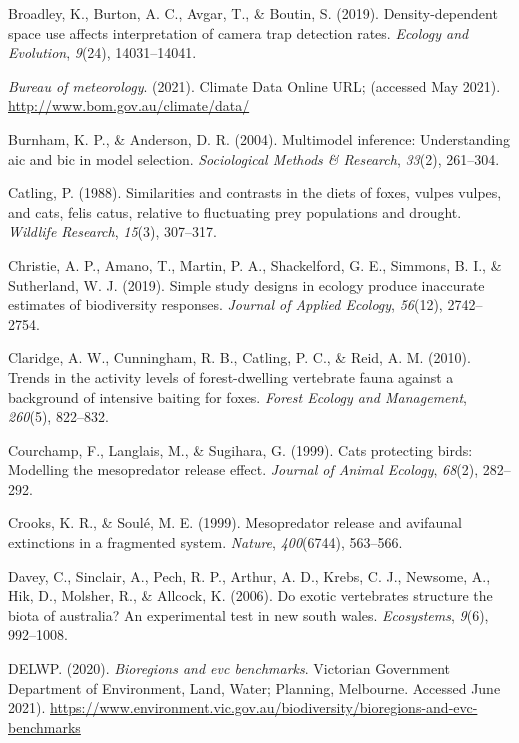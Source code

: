 \documentclass[]{elsarticle} %
\begin{document}
\leavevmode\hypertarget{ref-broadley2019}{}%
Broadley, K., Burton, A. C., Avgar, T., \& Boutin, S. (2019). Density-dependent space use affects interpretation of camera trap detection rates. \emph{Ecology and Evolution}, \emph{9}(24), 14031--14041.

\leavevmode\hypertarget{ref-BOM2021}{}%
\emph{Bureau of meteorology}. (2021). Climate Data Online URL; (accessed May 2021). \url{http://www.bom.gov.au/climate/data/}

\leavevmode\hypertarget{ref-burnham2004}{}%
Burnham, K. P., \& Anderson, D. R. (2004). Multimodel inference: Understanding aic and bic in model selection. \emph{Sociological Methods \& Research}, \emph{33}(2), 261--304.

\leavevmode\hypertarget{ref-catling1988}{}%
Catling, P. (1988). Similarities and contrasts in the diets of foxes, vulpes vulpes, and cats, felis catus, relative to fluctuating prey populations and drought. \emph{Wildlife Research}, \emph{15}(3), 307--317.

\leavevmode\hypertarget{ref-christie2019}{}%
Christie, A. P., Amano, T., Martin, P. A., Shackelford, G. E., Simmons, B. I., \& Sutherland, W. J. (2019). Simple study designs in ecology produce inaccurate estimates of biodiversity responses. \emph{Journal of Applied Ecology}, \emph{56}(12), 2742--2754.

\leavevmode\hypertarget{ref-claridge2010}{}%
Claridge, A. W., Cunningham, R. B., Catling, P. C., \& Reid, A. M. (2010). Trends in the activity levels of forest-dwelling vertebrate fauna against a background of intensive baiting for foxes. \emph{Forest Ecology and Management}, \emph{260}(5), 822--832.

\leavevmode\hypertarget{ref-courchamp1999}{}%
Courchamp, F., Langlais, M., \& Sugihara, G. (1999). Cats protecting birds: Modelling the mesopredator release effect. \emph{Journal of Animal Ecology}, \emph{68}(2), 282--292.

\leavevmode\hypertarget{ref-crooks1999}{}%
Crooks, K. R., \& Soulé, M. E. (1999). Mesopredator release and avifaunal extinctions in a fragmented system. \emph{Nature}, \emph{400}(6744), 563--566.

\leavevmode\hypertarget{ref-davey2006}{}%
Davey, C., Sinclair, A., Pech, R. P., Arthur, A. D., Krebs, C. J., Newsome, A., Hik, D., Molsher, R., \& Allcock, K. (2006). Do exotic vertebrates structure the biota of australia? An experimental test in new south wales. \emph{Ecosystems}, \emph{9}(6), 992--1008.

\leavevmode\hypertarget{ref-delwp2020}{}%
DELWP. (2020). \emph{Bioregions and evc benchmarks}. Victorian Government Department of Environment, Land, Water; Planning, Melbourne. Accessed June 2021). \url{https://www.environment.vic.gov.au/biodiversity/bioregions-and-evc-benchmarks}
\end{document}
